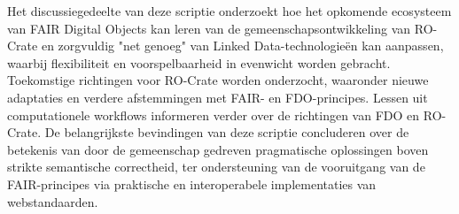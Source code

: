 Het discussiegedeelte van deze scriptie onderzoekt hoe het opkomende ecosysteem van FAIR Digital Objects kan leren van de gemeenschapsontwikkeling van RO-Crate en zorgvuldig "net genoeg" van Linked Data-technologieën kan aanpassen, waarbij flexibiliteit en voorspelbaarheid in evenwicht worden gebracht. Toekomstige richtingen voor RO-Crate worden onderzocht, waaronder nieuwe adaptaties en verdere afstemmingen met FAIR- en FDO-principes. Lessen uit computationele workflows informeren verder over de richtingen van FDO en RO-Crate. De belangrijkste bevindingen van deze scriptie concluderen over de betekenis van door de gemeenschap gedreven pragmatische oplossingen boven strikte semantische correctheid, ter ondersteuning van de vooruitgang van de FAIR-principes via praktische en interoperabele implementaties van webstandaarden.